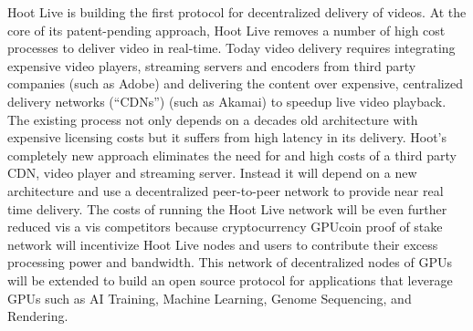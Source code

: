 Hoot Live is building the first protocol for decentralized delivery of videos. At the core of its patent-pending approach, Hoot Live removes a number of high cost processes to deliver video in real-time. Today video delivery requires integrating expensive video players, streaming servers and encoders from third party companies (such as Adobe) and delivering the content over expensive, centralized delivery networks (“CDNs”) (such as Akamai) to speedup live video playback. The existing process not only depends on a decades old architecture with expensive licensing costs but it suffers from high latency in its delivery. Hoot’s completely new approach eliminates the need for and high costs of a third party CDN, video player and streaming server. Instead it will depend on a new architecture and use a decentralized peer-to-peer network to provide near real time delivery. The costs of running the Hoot Live network will be even further reduced vis a vis competitors because cryptocurrency GPUcoin proof of stake network will incentivize Hoot Live nodes and users to contribute their excess processing power and bandwidth.
This network of decentralized nodes of GPUs will be extended to build an open source protocol for applications that leverage GPUs such as AI Training, Machine Learning, Genome Sequencing, and Rendering.

